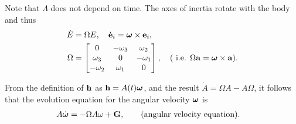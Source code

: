 Note that $\Lambda$ does not depend on time.
The axes of inertia rotate with the body and thus
\begin{align*}
   \dot E &= \Omega E , \quad \dot{\mathbf{ e}}_i = \boldsymbol{\omega}\times\mathbf{ e}_i , \\
  \Omega & = \begin{bmatrix}
    0 & -\omega_3 & \omega_2 \\
    \omega_3 & 0 & -\omega_1 \\
    - \omega_2 & \omega_1  & 0 
\end{bmatrix}     , \quad \text{( i.e. $\Omega\mathbf{ a} = \boldsymbol{\omega}\times\mathbf{ a}$)}.
\end{align*}

From the definition of $\mathbf{ h}$ as $\mathbf{ h} = A(t) \boldsymbol{\omega}$, and the result $\dot A  = \Omega A - A \Omega$,
it follows that the evolution equation for the angular velocity
$\boldsymbol{\omega}$ is
\begin{align*}
   A \dot {\boldsymbol{\omega}} &= - \Omega A \omega + \mathbf{ G} , \qquad \text{(angular velocity equation)}.
\end{align*}

% 
% 

